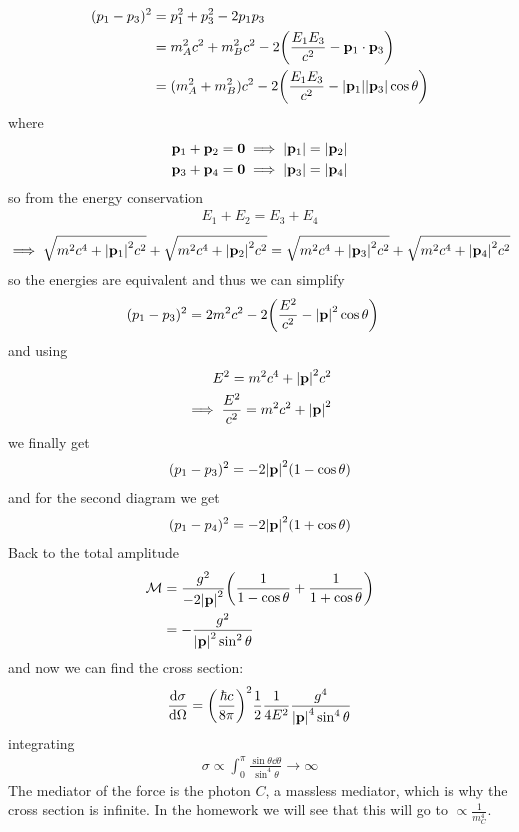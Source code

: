 \documentclass[../main.tex]{subfiles}
\begin{document}
\begin{align*}
    (p_1 - p_3)^2 &= p_1^2 + p_3^2 - 2p_1 p_3 \\
        &= m_A^2 c^2 + m_B^2 c^2 - 2 \qt(\frac{E_1 E_3}{c^2} - \vb p_1 \cdot \vb p_3) \\
        &= (m_A^2 + m_B^2)c^2 - 2 \qt(\frac{E_1 E_3}{c^2} - \abs{\vb p_1} \abs{\vb p_3} \cos\theta)
\end{align*}
where
\begin{align*}
    \vb p_1 + \vb p_2 = \vb 0 \implies \abs{\vb p_1} = \abs{\vb p_2} \\
    \vb p_3 + \vb p_4 = \vb 0 \implies \abs{\vb p_3} = \abs{\vb p_4}
\end{align*}
so from the energy conservation
\begin{align*}
    E_1 + E_2 = E_3 + E_4
\end{align*}
\begin{align*}
    \implies \sqrt{m^2 c^4 + \abs{\vb p_1}^2 c^2} + \sqrt{m^2 c^4 + \abs{\vb p_2}^2 c^2} 
    = \sqrt{m^2 c^4 + \abs{\vb p_3}^2 c^2} + \sqrt{m^2 c^4 + \abs{\vb p_4}^2 c^2}
\end{align*}
so the energies are equivalent and thus we can simplify
\begin{align*}
    (p_1 - p_3)^2 &= 2m^2 c^2 - 2 \qt(\frac{E^2}{c^2} - \abs{\vb p}^2 \cos\theta)
\end{align*}
and using
\begin{align*}
    E^2 = m^2 c^4 + \abs{\vb p}^2 c^2 \\
    \implies \frac{E^2}{c^2} = m^2 c^2 + \abs{\vb p}^2
\end{align*}
we finally get
\begin{align*}
    (p_1 - p_3)^2 = -2\abs{\vb p}^2 (1 - \cos\theta)
\end{align*}
and for the second diagram we get
\begin{align*}
    (p_1 - p_4)^2 = -2\abs{\vb p}^2 (1 + \cos\theta)
\end{align*}
Back to the total amplitude
\begin{align*}
    \mathcal{M} &= \frac{g^2}{-2\abs{\vb p}^2 } \qt(\frac{1}{1 - \cos\theta} + \frac{1}{1 + \cos\theta}) \\
    &= - \frac{g^2}{\abs{\vb p}^2 \sin^2 \theta} 
\end{align*}
and now we can find the cross section:
\begin{align*}
    \dv{\sigma}{\Omega} = \qt(\frac{\hbar c}{8\pi})^2 \frac{1}{2} \frac{1}{4E^2} \frac{g^4}{\abs{\vb p}^4 \sin^4 \theta}
\end{align*}
integrating
\begin{align*}
    \sigma \propto \int_0^\pi \frac{\sin\theta \dd{\theta}}{\sin^4 \theta} \to \infty
\end{align*}
The mediator of the force is the photon $C$, a massless mediator, which is why the cross section is
infinite. In the homework we will see that this will go to $\propto \frac{1}{m_C^4}$.
\end{document}

